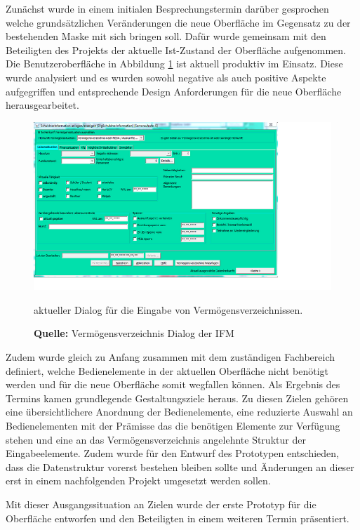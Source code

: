 Zunächst wurde in einem initialen Besprechungstermin darüber gesprochen welche grundsätzlichen Veränderungen die neue Oberfläche im Gegensatz zu der bestehenden Maske mit sich bringen soll. Dafür wurde gemeinsam mit den Beteiligten des Projekts der aktuelle Ist-Zustand der Oberfläche aufgenommen. Die Benutzeroberfläche in Abbildung \ref{fig:aktuellerDialog} ist aktuell produktiv im Einsatz. Diese wurde analysiert und es wurden sowohl negative als auch positive Aspekte aufgegriffen und entsprechende Design Anforderungen für die neue Oberfläche herausgearbeitet.
\begin{figure}[H]
  \centering
  \includegraphics[scale=1]{img/aktueller_Dialog.PNG}
  \caption{aktueller Dialog für die Eingabe von Vermögensverzeichnissen.}
  \caption*{\textbf{Quelle:} Vermögensverzeichnis Dialog der IFM}
  \label{fig:aktuellerDialog}
\end{figure}

Zudem wurde gleich zu Anfang zusammen mit dem zuständigen Fachbereich definiert, welche Bedienelemente in der aktuellen Oberfläche nicht benötigt werden und für die neue Oberfläche somit wegfallen können. Als Ergebnis des Termins kamen grundlegende Gestaltungsziele heraus. Zu diesen Zielen gehören eine übersichtlichere Anordnung der Bedienelemente, eine reduzierte Auswahl an Bedienelementen mit der Prämisse das die benötigen Elemente zur Verfügung stehen und eine an das Vermögensverzeichnis angelehnte Struktur der Eingabeelemente. Zudem wurde für den Entwurf des Prototypen entschieden, dass die Datenstruktur vorerst bestehen bleiben sollte und Änderungen an dieser erst in einem nachfolgenden Projekt umgesetzt werden sollen.

Mit dieser Ausgangssituation an Zielen wurde der erste Prototyp für die Oberfläche entworfen und den Beteiligten in einem weiteren Termin präsentiert.

